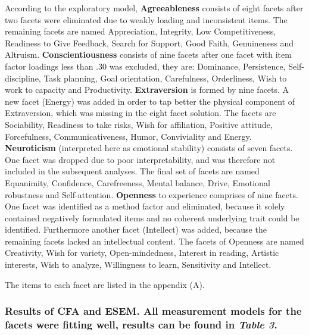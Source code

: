 \documentclass[,man,floatsintext]{apa6}
\theoremstyle{definition}
\theoremstyle{definition}
\theoremstyle{definition}
\theoremstyle{remark}
\begin{document}
According to the exploratory model, \textbf{Agreeableness} consists of
eight facets after two facets were eliminated due to weakly loading and
inconsistent items. The remaining facets are named Appreciation,
Integrity, Low Competitiveness, Readiness to Give Feedback, Search for
Support, Good Faith, Genuineness and Altruism.
\textbf{Conscientiousness} consists of nine facets after one facet with
item factor loadings less than .30 was excluded, they are: Dominance,
Persistence, Self-discipline, Task planning, Goal orientation,
Carefulness, Orderliness, Wish to work to capacity and Productivity.
\textbf{Extraversion} is formed by nine facets. A new facet (Energy) was
added in order to tap better the physical component of Extraversion,
which was missing in the eight facet solution. The facets are
Sociability, Readiness to take risks, Wish for affiliation, Positive
attitude, Forcefulness, Communicativeness, Humor, Conviviality and
Energy. \textbf{Neuroticism} (interpreted here as emotional stability)
consists of seven facets. One facet was dropped due to poor
interpretability, and was therefore not included in the subsequent
analyses. The final set of facets are named Equanimity, Confidence,
Carefreeness, Mental balance, Drive, Emotional robustness and
Self-attention. \textbf{Openness} to experience comprises of nine
facets. One facet was identified as a method factor and eliminated,
because it solely contained negatively formulated items and no coherent
underlying trait could be identified. Furthermore another facet
(Intellect) was added, because the remaining facets lacked an
intellectual content. The facets of Openness are named Creativity, Wish
for variety, Open-mindedness, Interest in reading, Artistic interests,
Wish to analyze, Willingness to learn, Sensitivity and Intellect.

The items to each facet are listed in the appendix (A).

\hypertarget{results-of-cfa-and-esem.-all-measurement-models-for-the-facets-were-fitting-well-results-can-be-found-in-table-3.}{%
\subsubsection{\texorpdfstring{Results of CFA and ESEM. All measurement
models for the facets were fitting well, results can be found in
\emph{Table
3}.}{Results of CFA and ESEM. All measurement models for the facets were fitting well, results can be found in Table 3.}}\label{results-of-cfa-and-esem.-all-measurement-models-for-the-facets-were-fitting-well-results-can-be-found-in-table-3.}}
\end{document}

